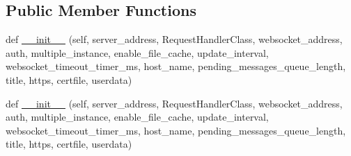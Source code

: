 \subsection*{Public Member Functions}
\begin{DoxyCompactItemize}
\item 
def \hyperlink{classremi_1_1server_1_1ThreadedHTTPServer_a3a62437b99ad97ce783ccaae255d639c}{\+\_\+\+\_\+init\+\_\+\+\_\+} (self, server\+\_\+address, Request\+Handler\+Class, websocket\+\_\+address, auth, multiple\+\_\+instance, enable\+\_\+file\+\_\+cache, update\+\_\+interval, websocket\+\_\+timeout\+\_\+timer\+\_\+ms, host\+\_\+name, pending\+\_\+messages\+\_\+queue\+\_\+length, title, https, certfile, userdata)
\item 
def \hyperlink{classremi_1_1server_1_1ThreadedHTTPServer_a3a62437b99ad97ce783ccaae255d639c}{\+\_\+\+\_\+init\+\_\+\+\_\+} (self, server\+\_\+address, Request\+Handler\+Class, websocket\+\_\+address, auth, multiple\+\_\+instance, enable\+\_\+file\+\_\+cache, update\+\_\+interval, websocket\+\_\+timeout\+\_\+timer\+\_\+ms, host\+\_\+name, pending\+\_\+messages\+\_\+queue\+\_\+length, title, https, certfile, userdata)
\end{DoxyCompactItemize}
